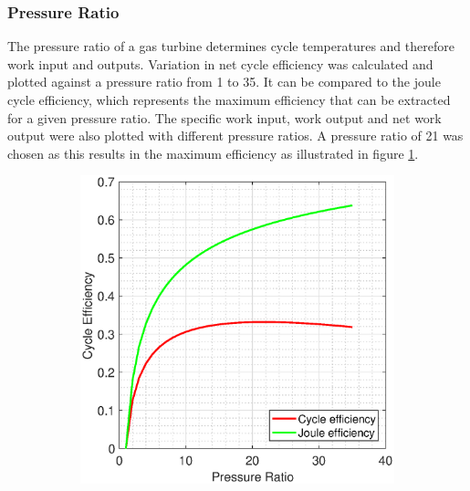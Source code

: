 \documentclass[11pt, oneside]{article}
\begin{document}
\subsubsection{Pressure Ratio} 
The pressure ratio of a gas turbine determines cycle temperatures and therefore work input and outputs. Variation in net cycle efficiency was calculated and plotted against a pressure ratio from 1 to 35. It can be compared to the joule cycle efficiency, which represents the maximum efficiency that can be extracted for a given pressure ratio. The specific work input, work output and net work output were also plotted with different pressure ratios. A pressure ratio of 21 was chosen as this results in the maximum efficiency as illustrated in figure \ref{fig:efficiencysimple}.
 \begin{figure} [h]
\centering
\begin{subfigure}{.7\textwidth}
\centering
 \includegraphics[width=0.9\linewidth]{./pictures/efficiencysimple.eps}
  \label{fig:efficiencysimple}
\end{subfigure}
\begin{subfigure}{.7\textwidth}
 \centering

\end{subfigure}
\end{figure}
\end{document}
